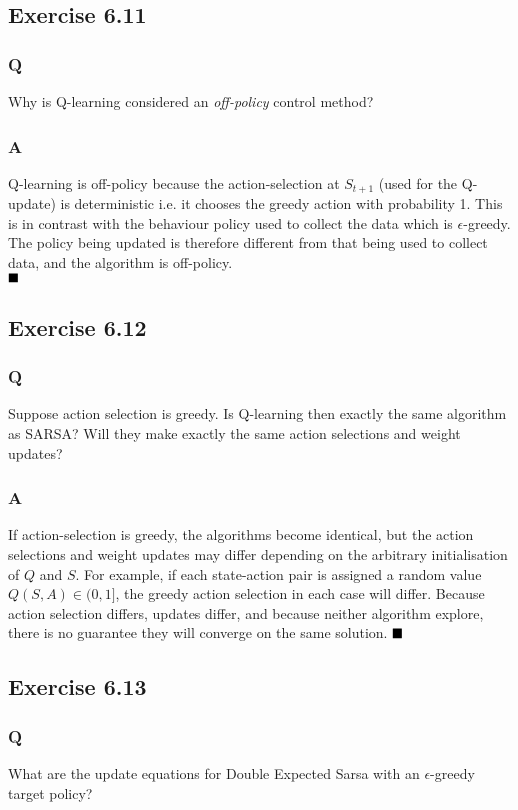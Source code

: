 \subsection{Exercise 6.11}
\subsubsection{Q}
Why is Q-learning considered an \textit{off-policy} control method?
\subsubsection{A}
Q-learning is off-policy because the action-selection at $S_{t+1}$ (used for the Q-update) is deterministic i.e. it chooses the greedy action with probability 1. This is in contrast with the behaviour policy used to collect the data which is $\epsilon$-greedy. The policy being updated is therefore different from that being used to collect data, and the algorithm is off-policy.\\
$
\hfill \blacksquare
$

\subsection{Exercise 6.12}
\subsubsection{Q}
Suppose action selection is greedy. Is Q-learning then exactly the same algorithm as SARSA? Will they make exactly the same action selections and weight updates?
\subsubsection{A}
If action-selection is greedy, the algorithms become identical, but the action selections and weight updates may differ depending on the arbitrary initialisation of $Q$ and $S$. For example, if each state-action pair is assigned a random value $Q(S, A) \in (0,1]$, the greedy action selection in each case will differ. Because action selection differs, updates differ, and because neither algorithm explore, there is no guarantee they will converge on the same solution.
$
\hfill \blacksquare
$

\subsection{Exercise 6.13}
\subsubsection{Q}
What are the update equations for Double Expected Sarsa with an $\epsilon$-greedy target policy?
